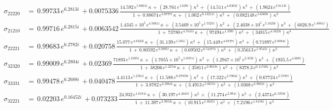 \begin{align}
  \sigma_{22220} \, &= \, 0.99733\,e^{6.2813i} \, + 0.0075336 \, \frac{   14.592\,e^{5.0601i}\,\kappa \, + \, (28.761\,e^{1.629i})\,{\kappa}^{2} \, + \, (14.511\,e^{4.6362i})\,{\kappa}^{3} \, + \, (1.9624\,e^{3.0113i})  }{ 1 \, + \,   0.88674\,e^{3.0787i}\,\kappa \, + \, (1.002\,e^{0.13211i})\,{\kappa}^{2} \, + \, (0.082148\,e^{5.6369i})\,{\kappa}^{3} }   \\
  \sigma_{21210} \, &= \, 0.99716\,e^{6.2815i} \, + 0.0063542 \, \frac{   1.4345\times 10^5\,e^{4.5061i}\,\kappa \, + \, (3.5469\times 10^5\,e^{1.7327i})\,{\kappa}^{2} \, + \, (2.4038\times 10^5\,e^{5.1629i})\,{\kappa}^{3} \, + \, (6026.9\,e^{1.8881i})  }{ 1 \, + \,   73780\,e^{4.5545i}\,\kappa \, + \, (97494\,e^{1.398i})\,{\kappa}^{2} \, + \, (34815\,e^{4.5623i})\,{\kappa}^{3} }   \\
  \sigma_{22221} \, &= \, 0.99683\,e^{6.2782i} \, + 0.020758 \, \frac{   15.077\,e^{4.8323i}\,\kappa \, + \, (31.139\,e^{1.585i})\,{\kappa}^{2} \, + \, (15.449\,e^{4.6727i})\,{\kappa}^{3} \, + \, (0.71897\,e^{2.8084i})  }{ 1 \, + \,   0.80592\,e^{3.3995i}\,\kappa \, + \, (0.69502\,e^{0.54275i})\,{\kappa}^{2} \, + \, (0.35613\,e^{5.9545i})\,{\kappa}^{3} }   \\
  \sigma_{32320} \, &= \, 0.99009\,e^{6.2804i} \, + 0.02369 \, \frac{   71893\,e^{1.2395i}\,\kappa \, + \, (1.7055\times 10^5\,e^{5.0371i})\,{\kappa}^{2} \, + \, (1.2947\times 10^5\,e^{2.359i})\,{\kappa}^{3} \, + \, (1935.5\,e^{4.668i})  }{ 1 \, + \,   38206\,e^{1.2254i}\,\kappa \, + \, (35811\,e^{3.9618i})\,{\kappa}^{2} \, + \, (8378.3\,e^{0.11726i})\,{\kappa}^{3} }   \\
  \sigma_{33331} \, &= \, 0.99478\,e^{6.2688i} \, + 0.040478 \, \frac{   4.4113\,e^{1.2501i}\,\kappa \, + \, (11.588\,e^{0.27959i})\,{\kappa}^{2} \, + \, (17.322\,e^{3.7904i})\,{\kappa}^{3} \, + \, (0.67724\,e^{2.5797i})  }{ 1 \, + \,   3.8782\,e^{2.2864i}\,\kappa \, + \, (3.4913\,e^{5.6655i})\,{\kappa}^{2} \, + \, (1.0368\,e^{2.9082i})\,{\kappa}^{3} }   \\
  \sigma_{32221} \, &= \, 0.02203\,e^{0.16452i} \, + 0.073233 \, \frac{   24.932\,e^{1.0181i}\,\kappa \, + \, (30.197\,e^{4.4047i})\,{\kappa}^{2} \, + \, (11.274\,e^{2.981i})\,{\kappa}^{3} \, + \, (2.4374\,e^{6.1959i})  }{ 1 \, + \,   11.397\,e^{3.9953i}\,\kappa \, + \, (10.915\,e^{5.8025i})\,{\kappa}^{2} \, + \, (7.2196\,e^{1.8176i})\,{\kappa}^{3} }   \\

\end{align}
